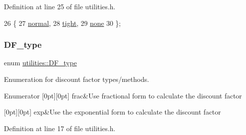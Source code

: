 Definition at line 25 of file utilities.\+h.


\begin{DoxyCode}
26     \{ 
27         \hyperlink{namespaceutilities_ab1a1517bf6e62a1acfab5293ca8985c1afea087517c26fadd409bd4b9dc642555}{normal}, 
28         \hyperlink{namespaceutilities_ab1a1517bf6e62a1acfab5293ca8985c1a0423fa423baf1ea8139f6662869faf2f}{tight}, 
29         \hyperlink{namespaceea_a8e369877773b4db67b8512efdb4f8f89a334c4a4c42fdb79d7ebc3e73b517e6f8}{none} 
30     \};
\end{DoxyCode}
\mbox{\label{namespaceutilities_ad4290e607d0651ce53db6e5c776aca7c}} 
\subsubsection{\texorpdfstring{D\+F\+\_\+type}{DF\_type}}
{\footnotesize\ttfamily enum \hyperlink{namespaceutilities_ad4290e607d0651ce53db6e5c776aca7c}{utilities\+::\+D\+F\+\_\+type}\hspace{0.3cm}{\ttfamily [strong]}}



Enumeration for discount factor types/methods. 

\begin{DoxyEnumFields}{Enumerator}
[0pt][0pt]{}\mbox{\label{namespaceutilities_ad4290e607d0651ce53db6e5c776aca7ca8a3baba97ec51277ed8ac64e456f6027}} 
frac&Use fractional form to calculate the discount factor \\
\hline

[0pt][0pt]{}\mbox{\label{namespaceutilities_ad4290e607d0651ce53db6e5c776aca7cab0ab0254bd58eb87eaee3172ba49fefb}} 
exp&Use the exponential form to calculate the discount factor \\
\hline

\end{DoxyEnumFields}


Definition at line 17 of file utilities.\+h.


